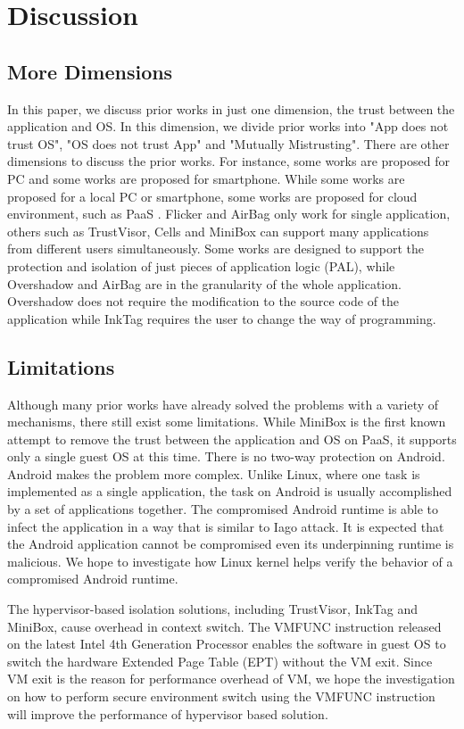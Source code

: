 \section{Discussion}
\label{sec:discussion}

\subsection{More Dimensions} 

In this paper, we discuss prior works in just one dimension, the trust between
the application and OS. In this dimension, we divide prior works into "App does
not trust OS", "OS does not trust App" and "Mutually Mistrusting". There are
other dimensions to discuss the prior works. For instance, some works
\cite{Flicker, TrustVisor, Overshadow, InkTag, VirtualGhost, CloudTerminal,
SFI, PittSFIeld, NaCl, Krude, MiniBox} are proposed for PC and some works
\cite{TLR, VeriUI, TrustUI, TrustDroid, Cells, AirBag} are proposed for
smartphone. While some works are proposed for a local PC or smartphone, some
works are proposed for cloud environment, such as PaaS \cite{Krude, MiniBox}.
Flicker and AirBag only work for single application, others such as TrustVisor,
Cells and MiniBox can support many applications from different users
simultaneously. Some works are designed to support the protection and isolation
of just pieces of application logic (PAL), while Overshadow and AirBag are in
the granularity of the whole application. Overshadow does not require the
modification to the source code of the application while InkTag requires the
user to change the way of programming.

\subsection{Limitations}

Although many prior works have already solved the problems with a variety of
mechanisms, there still exist some limitations. While MiniBox \cite{MiniBox} is
the first known attempt to remove the trust between the application and OS on
PaaS, it supports only a single guest OS at this time. There is no two-way
protection on Android. Android makes the problem more complex. Unlike Linux,
where one task is implemented as a single application, the task on Android is
usually accomplished by a set of applications together. The compromised Android
runtime is able to infect the application in a way that is similar to Iago
attack. It is expected that the Android application cannot be compromised even
its underpinning runtime is malicious. We hope to investigate how Linux kernel
helps verify the behavior of a compromised Android runtime. 

The hypervisor-based isolation solutions, including TrustVisor, InkTag and
MiniBox, cause overhead in context switch. The VMFUNC instruction released on
the latest Intel 4th Generation Processor enables the software in guest OS to
switch the hardware Extended Page Table (EPT) without the VM exit. Since VM
exit is the reason for performance overhead of VM, we hope the investigation on
how to perform secure environment switch using the VMFUNC instruction will
improve the performance of hypervisor based solution.
